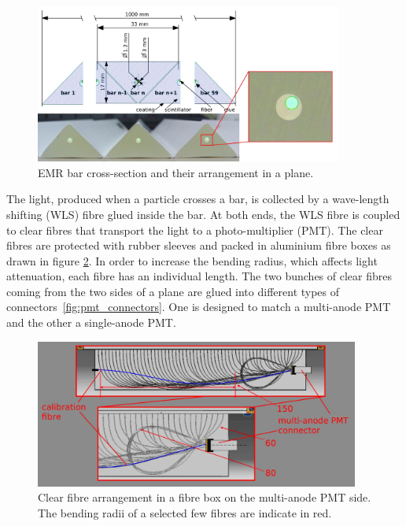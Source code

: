 \documentclass[a4paper,11pt]{article}
\begin{document}
\begin{figure}[htp!]
 \centering
 \includegraphics[width=0.9\textwidth]{./bar_arrangement_in_a_plane}
 \caption[EMR bar cross-section and plane arrangement]{EMR bar cross-section and their arrangement in a plane.}
 \label{fig:bar_arrangement_in_a_plane}
\end{figure}


The light, produced when a particle crosses a bar, is collected by a wave-length shifting (WLS) fibre glued inside the bar. 
At both ends, the WLS fibre is coupled to clear fibres that transport the light to a photo-multiplier
(PMT). The clear fibres are protected with rubber sleeves and packed in aluminium fibre boxes as drawn in figure 
\ref{fig:clear_fibre_package}. In order to increase the bending radius, which affects light attenuation, each fibre has an individual
length. The two bunches of clear fibres coming from the two sides of a plane are glued into different types of connectors~\ref{fig:pmt_connectors}.
One is designed to match a multi-anode PMT and the other a single-anode PMT.

\begin{figure}[ht]
 \centering
 \includegraphics[width=0.95\textwidth]{./clear_fiber_package}
 \caption[A package of clear fibres in a fibre box]{Clear fibre arrangement in a fibre box on the  multi-anode PMT side. The bending radii of a selected few fibres are indicate in red.}
 \label{fig:clear_fibre_package}
\end{figure}
\end{document}

